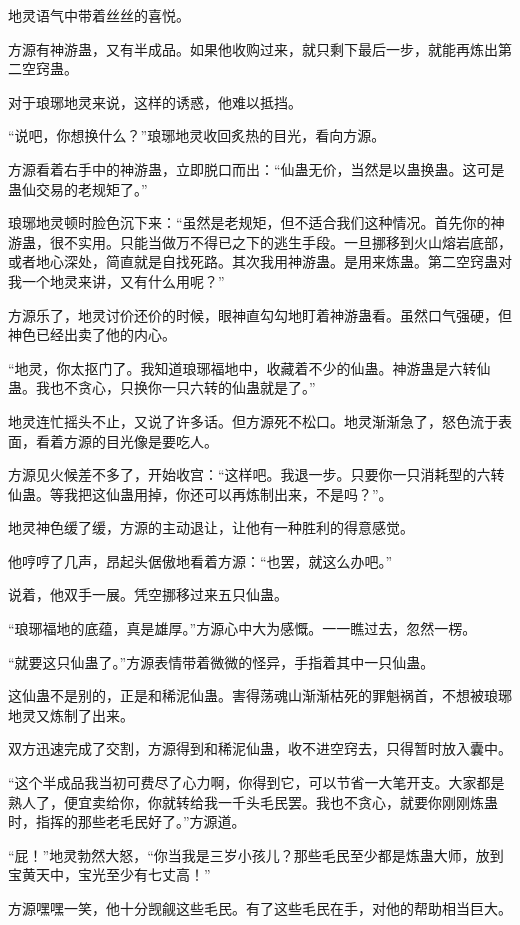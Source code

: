\begin{this_body}
地灵语气中带着丝丝的喜悦。

方源有神游蛊，又有半成品。如果他收购过来，就只剩下最后一步，就能再炼出第二空窍蛊。

对于琅琊地灵来说，这样的诱惑，他难以抵挡。

“说吧，你想换什么？”琅琊地灵收回炙热的目光，看向方源。

方源看着右手中的神游蛊，立即脱口而出：“仙蛊无价，当然是以蛊换蛊。这可是蛊仙交易的老规矩了。”

琅琊地灵顿时脸色沉下来：“虽然是老规矩，但不适合我们这种情况。首先你的神游蛊，很不实用。只能当做万不得已之下的逃生手段。一旦挪移到火山熔岩底部，或者地心深处，简直就是自找死路。其次我用神游蛊。是用来炼蛊。第二空窍蛊对我一个地灵来讲，又有什么用呢？”

方源乐了，地灵讨价还价的时候，眼神直勾勾地盯着神游蛊看。虽然口气强硬，但神色已经出卖了他的内心。

“地灵，你太抠门了。我知道琅琊福地中，收藏着不少的仙蛊。神游蛊是六转仙蛊。我也不贪心，只换你一只六转的仙蛊就是了。”

地灵连忙摇头不止，又说了许多话。但方源死不松口。地灵渐渐急了，怒色流于表面，看着方源的目光像是要吃人。

方源见火候差不多了，开始收宫：“这样吧。我退一步。只要你一只消耗型的六转仙蛊。等我把这仙蛊用掉，你还可以再炼制出来，不是吗？”。

地灵神色缓了缓，方源的主动退让，让他有一种胜利的得意感觉。

他哼哼了几声，昂起头倨傲地看着方源：“也罢，就这么办吧。”

说着，他双手一展。凭空挪移过来五只仙蛊。

“琅琊福地的底蕴，真是雄厚。”方源心中大为感慨。一一瞧过去，忽然一楞。

“就要这只仙蛊了。”方源表情带着微微的怪异，手指着其中一只仙蛊。

这仙蛊不是别的，正是和稀泥仙蛊。害得荡魂山渐渐枯死的罪魁祸首，不想被琅琊地灵又炼制了出来。

双方迅速完成了交割，方源得到和稀泥仙蛊，收不进空窍去，只得暂时放入囊中。

“这个半成品我当初可费尽了心力啊，你得到它，可以节省一大笔开支。大家都是熟人了，便宜卖给你，你就转给我一千头毛民罢。我也不贪心，就要你刚刚炼蛊时，指挥的那些老毛民好了。”方源道。

“屁！”地灵勃然大怒，“你当我是三岁小孩儿？那些毛民至少都是炼蛊大师，放到宝黄天中，宝光至少有七丈高！”

方源嘿嘿一笑，他十分觊觎这些毛民。有了这些毛民在手，对他的帮助相当巨大。


\end{this_body}
